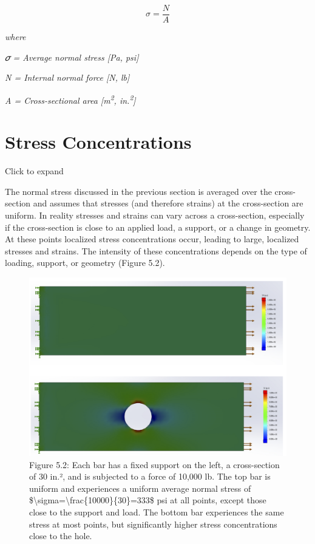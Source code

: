 \documentclass[
  letterpaper,
  DIV=11,
  numbers=noendperiod]{scrreprt}
\begin{document}
\[
\sigma=\frac{N}{A}\]

\emph{where}

\emph{𝜎 = Average normal stress {[}Pa, psi{]}}

\emph{N = Internal normal force {[}N, lb{]}}

\emph{A = Cross-sectional area {[}m\textsuperscript{2},
in.\textsuperscript{2}{]}}

\section{Stress Concentrations}\label{stress-concentrations}

Click to expand

The normal stress discussed in the previous section is averaged over the
cross-section and assumes that stresses (and therefore strains) at the
cross-section are uniform. In reality stresses and strains can vary
across a cross-section, especially if the cross-section is close to an
applied load, a support, or a change in geometry. At these points
localized stress concentrations occur, leading to large, localized
stresses and strains. The intensity of these concentrations depends on
the type of loading, support, or geometry (Figure 5.2).

\begin{figure}[H]

{\centering \includegraphics[width=5.89583in,height=\textheight]{images/PNGs/Figure 5.2.png}

}

\caption{Figure 5.2: Each bar has a fixed support on the left, a
cross-section of 30 in.², and is subjected to a force of 10,000 lb. The
top bar is uniform and experiences a uniform average normal stress of
\$\textbackslash sigma=\textbackslash frac\{10000\}\{30\}=333\$ psi at
all points, except those close to the support and load. The bottom bar
experiences the same stress at most points, but significantly higher
stress concentrations close to the hole.}

\end{figure}%
\end{document}
